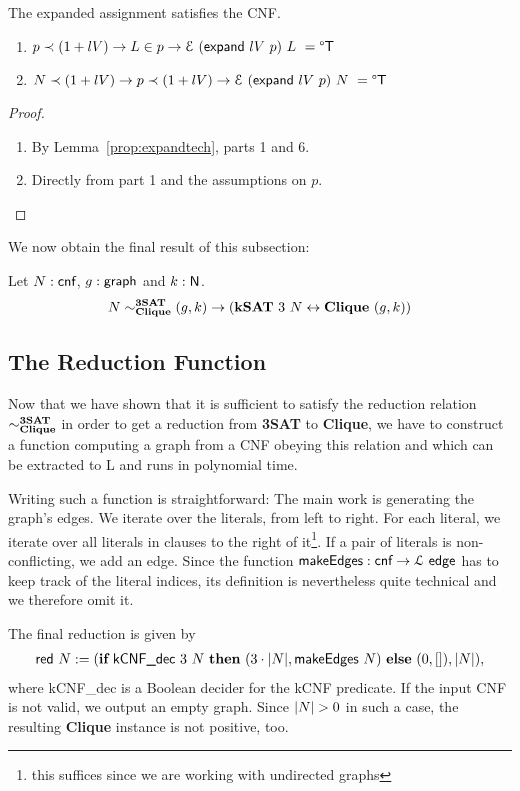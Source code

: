\documentclass[a4paper,UKenglish,cleveref, autoref]{lipics-v2019}
\begin{document}
\begin{corollary}
  The expanded assignment satisfies the CNF. 
  \begin{enumerate}
    \item $p \prec (1 +{lV}) \rightarrow L \in p \rightarrow \mathcal{E}~(\normalfont\textsf{expand}~lV~p)~L~ = \degree\mathsf{T}$
    \item $N \prec (1 +{lV}) \rightarrow p \prec(1 +{lV}) \rightarrow \mathcal{E}~(\normalfont\textsf{expand}~lV~p)~N~ = \degree\mathsf{T}$
  \end{enumerate}
\end{corollary}
\begin{proof}
  \begin{enumerate}
    \item By Lemma~\ref{prop:expandtech}, parts 1 and 6.
    \item Directly from part 1 and the assumptions on $p$.
  \end{enumerate}
\end{proof}

We now obtain the final result of this subsection:
\begin{lemma}\label{prop:redrelreduces}
  Let $N : \textsf{cnf}$, $g : \textsf{graph}$ and $k : \mathsf{N}$. 
  \[N \sim^{\textbf{3SAT}}_{\textbf{Clique}} (g, k) \rightarrow (\textbf{kSAT}~3~N \leftrightarrow \textbf{Clique}~(g, k)) \]
\end{lemma}

\subsection{The Reduction Function}
Now that we have shown that it is sufficient to satisfy the reduction relation $\sim^{\textbf{3SAT}}_{\textbf{Clique}}$ in order to get a reduction from \textbf{3SAT} to \textbf{Clique}, we have to construct a function computing a graph from a CNF obeying this relation and which can be extracted to L and runs in polynomial time.

Writing such a function is straightforward: The main work is generating the graph's edges. We iterate over the literals, from left to right. For each literal, we iterate over all literals in clauses to the right of it\footnote{this suffices since we are working with undirected graphs}. If a pair of literals is non-conflicting, we add an edge.
Since the function $\textsf{makeEdges}: \textsf{cnf} \rightarrow \mathcal{L}~{\textsf{edge}}$ has to keep track of the literal indices, its definition is nevertheless quite technical and we therefore omit it. 

The final reduction is given by 
\begin{align*}
\textsf{red}~N := (\textbf{if}~{\textsf{kCNF\_dec}~3~N}~\textbf{then}~{(3 \cdot |N|, \textsf{makeEdges}~N)}~\textbf{else}~{(0, [])}, |N|), 
\end{align*}
where \textsf{kCNF\_dec} is a Boolean decider for the \textsf{kCNF} predicate. If the input CNF is not valid, we output an empty graph. Since $|N| > 0$ in such a case, the resulting \textbf{Clique} instance is not positive, too.
\end{document}
